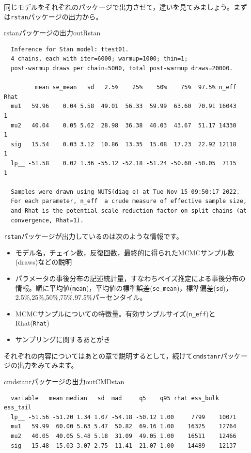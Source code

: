 \documentclass{ltjsbook}
\begin{document}
同じモデルをそれぞれのパッケージで出力させて，違いを見てみましょう。まずは\verb|rstan|パッケージの出力から。

\begin{SCrstan}{rstanパッケージの出力}{outRstan}
	\begin{verbatim}
  Inference for Stan model: ttest01.
  4 chains, each with iter=6000; warmup=1000; thin=1; 
  post-warmup draws per chain=5000, total post-warmup draws=20000.
  
         mean se_mean   sd   2.5%    25%    50%    75%  97.5% n_eff Rhat
  mu1   59.96    0.04 5.58  49.01  56.33  59.99  63.60  70.91 16043    1
  mu2   40.04    0.05 5.62  28.98  36.38  40.03  43.67  51.17 14330    1
  sig   15.54    0.03 3.12  10.86  13.35  15.08  17.23  22.92 12118    1
  lp__ -51.58    0.02 1.36 -55.12 -52.18 -51.24 -50.60 -50.05  7115    1
  
  Samples were drawn using NUTS(diag_e) at Tue Nov 15 09:50:17 2022.
  For each parameter, n_eff  a crude measure of effective sample size,
  and Rhat is the potential scale reduction factor on split chains (at 
  convergence, Rhat=1).
\end{verbatim}
\end{SCrstan}

\verb|rstan|パッケージが出力しているのは次のような情報です。
\begin{itemize}
	\item モデル名，チェイン数，反復回数，最終的に得られたMCMCサンプル数(draws)などの説明
	\item パラメータの事後分布の記述統計量，すなわちベイズ推定による事後分布の情報。順に平均値(\verb|mean|)，平均値の標準誤差(\verb|se_mean|)，標準偏差(\verb|sd|)，2.5\%,25\%,50\%,75\%,97.5\%パーセンタイル。
	\item MCMCサンプルについての特徴量。有効サンプルサイズ(\verb|n_eff|)とRhat(\verb|Rhat|)
	\item サンプリングに関するあとがき
\end{itemize}
それぞれの内容についてはあとの章で説明するとして，続けて\verb|cmdstanr|パッケージの出力をみてみます。
\begin{SCcmd}{cmdstanrパッケージの出力}{outCMDstan}
	\begin{verbatim}
  variable   mean median   sd  mad     q5    q95 rhat ess_bulk ess_tail
  lp__ -51.56 -51.20 1.34 1.07 -54.18 -50.12 1.00     7799    10071
  mu1   59.99  60.00 5.63 5.47  50.82  69.16 1.00    16325    12764
  mu2   40.05  40.05 5.48 5.18  31.09  49.05 1.00    16511    12466
  sig   15.48  15.03 3.07 2.75  11.41  21.07 1.00    14489    12137
\end{verbatim}
\end{SCcmd}
\end{document}
